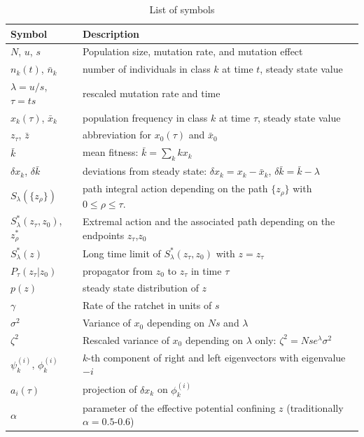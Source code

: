 \documentclass[rmp,preprint]{revtex4}
\newcommand{\x}{x}
\newcommand{\xs}{\bar{\x}}
\newcommand{\xz}{z}
\newcommand{\xzs}{\bar{\xz}}
\newcommand{\dx}{\delta \x}
\newcommand{\n}{n}
\newcommand{\rate}{\gamma}
\newcommand{\ns}{\bar{\n}}
\newcommand{\mk}{\bar{k}}
\newcommand{\dk}{\delta \bar{k}}
\newcommand{\mr}[1]{\psi^{(#1)}}
\newcommand{\ml}[1]{\phi^{(#1)}}
\newcommand{\Smin}{S^*}
\begin{document}
\begin{table}
\begin{tabular}{|l|l|}
\hline
Symbol & Description \\
\hline \hline
$N$, $u$, $s$ & Population size, mutation rate, and mutation effect \\
$\n_k(t)$, $\ns_k$ & number of individuals in class $k$ at time $t$, steady state value\\
$\lambda = u/s$, $\tau=ts$ & rescaled mutation rate and time \\
$\x_k(\tau)$, $\xs_k$ &  population frequency in class $k$ at time $\tau$, steady state value \\ 
$\xz_{\tau}$, $\xzs$ & abbreviation for $\x_0(\tau)$ and $\xs_0$ \\
$\mk$ & mean fitness: $\mk=\sum_k k\x_k$\\
$\dx_k$, $\dk$&  deviations from steady state: $\dx_k = \x_k-\xs_k$, $\dk=\mk-\lambda$\\
$S_{\lambda}(\{\xz_\rho\})$ & path integral action depending on the path $\{\xz_{\rho}\}$ with $0\leq \rho \leq\tau$.\\
$\Smin_{\lambda}(\xz_{\tau}, \xz_{0})$, $\xz^*_{\rho}$ & Extremal action and the associated path depending on the endpoints $\xz_{\tau}$,$\xz_{0}$\\
$\Smin_{\lambda}(\xz)$ & Long time limit of $\Smin_{\lambda}(\xz_{\tau}, \xz_{0})$ with $\xz=\xz_{\tau}$\\
$P_{\tau}(\xz_\tau|\xz_0)$ & propagator from $\xz_0$ to $\xz_\tau$ in time $\tau$\\
$p(\xz)$ & steady state distribution of $\xz$\\
$\rate$ & Rate of the ratchet in units of $s$ \\
$\sigma^2$ & Variance of $\x_0$ depending on $Ns$ and $\lambda$\\
$\zeta^2$ & Rescaled variance of $\x_0$ depending on $\lambda$ only: $\zeta^2 = Nse^{\lambda}\sigma^2$\\
$\mr{i}_k$, $\ml{i}_k$ & $k$-th component of right and left eigenvectors with eigenvalue $-i$\\
$a_i(\tau)$ & projection of $\dx_k$ on $\ml{i}_k$\\
$\alpha$ & parameter of the effective potential confining $\xz$ (traditionally  $\alpha=0.5$-$0.6$) \\
\hline
\end{tabular}
\caption{List of symbols}
\label{tablelabel}
\end{table}
\end{document}
